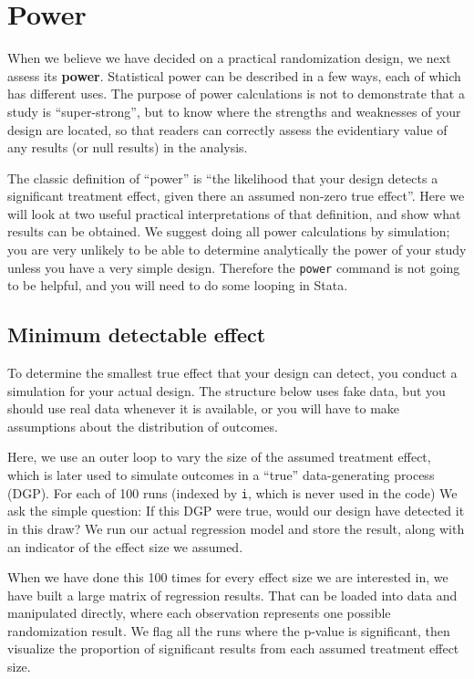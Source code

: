 \section{Power}

When we believe we have decided on a practical randomization design,
we next assess its \textbf{power}.
Statistical power can be described in a few ways,
each of which has different uses.
The purpose of power calculations is not to
demonstrate that a study is ``super-strong'',
but to know where the strengths and weaknesses
of your design are located, so that readers
can correctly assess the evidentiary value of
any results (or null results) in the analysis.

The classic definition of ``power'' is
``the likelihood that your design detects a significant treatment effect,
given there an assumed non-zero true effect''.
Here we will look at two useful practical interpretations
of that definition, and show what results can be obtained.
We suggest doing all power calculations by simulation;
you are very unlikely to be able to determine analytically
the power of your study unless you have a very simple design.
Therefore the \texttt{power} command is not going to be helpful,
and you will need to do some looping in Stata.

\subsection{Minimum detectable effect}

To determine the smallest true effect that your design can detect,
you conduct a simulation for your actual design.
The structure below uses fake data,
but you should use real data whenever it is available,
or you will have to make assumptions about the distribution of outcomes.

Here, we use an outer loop to vary the size of the assumed treatment effect,
which is later used to simulate outcomes in a ``true''
data-generating process (DGP).
For each of 100 runs (indexed by \texttt{i}, which is never used in the code)
We ask the simple question: If this DGP were true,
would our design have detected it in this draw?
We run our actual regression model and store the result,
along with an indicator of the effect size we assumed.

When we have done this 100 times for every effect size we are interested in,
we have built a large matrix of regression results.
That can be loaded into data and manipulated directly,
where each observation represents one possible randomization result.
We flag all the runs where the p-value is significant,
then visualize the proportion of significant results
from each assumed treatment effect size.

